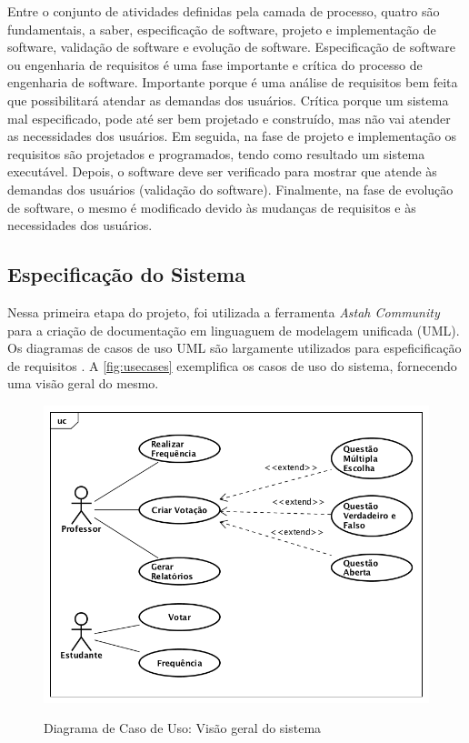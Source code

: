 Entre o conjunto de atividades definidas pela camada de processo, quatro são
fundamentais, a saber, especificação de software, projeto e implementação de
software, validação de software e evolução de software. Especificação de software
ou engenharia de requisitos é uma fase importante e crítica do processo de engenharia
de software. Importante porque é uma análise de requisitos bem feita que possibilitará
atendar as demandas dos usuários. Crítica porque um sistema mal especificado, pode até ser
bem projetado e construído, mas não vai atender as necessidades dos usuários.
Em seguida, na fase de projeto e implementação os requisitos são projetados e programados,
tendo como resultado um sistema executável. Depois, o software deve ser verificado
para mostrar que atende às demandas dos usuários (validação do software). Finalmente,
na fase de evolução de software, o mesmo é modificado devido às mudanças
de requisitos e às necessidades dos usuários.

\subsection{Especificação do Sistema}
Nessa primeira etapa do projeto, foi utilizada a ferramenta \textit{Astah Community} \cite{astah2016}
para a criação de documentação em linguaguem de modelagem unificada (UML). Os diagramas
de casos de uso UML são largamente utilizados para espeficificação de requisitos \cite{Sommerville2006}.
A \autoref{fig:usecases} exemplifica os casos de uso do sistema, fornecendo uma
visão geral do mesmo.

\begin{figure}[!htb]
  \centering
  \caption{Diagrama de Caso de Uso: Visão geral do sistema}
  \includegraphics[width=.75\textwidth]{imagens/casodeuso}
  \label{fig:usecases}
\end{figure}

